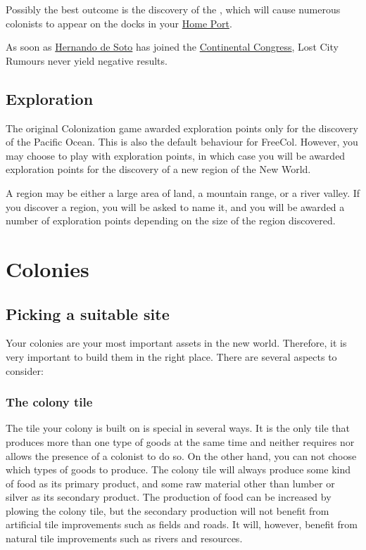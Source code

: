 \documentclass[12pt]{book}
\begin{document}
Possibly the best outcome is the discovery of the , which will cause numerous colonists to appear on the docks in
your \hyperlink{Home Port}{Home Port}.

As soon as \hyperlink{Hernando de Soto}{Hernando de Soto} has joined
the \hyperlink{Continental Congress}{Continental Congress}, Lost City
Rumours never yield negative results.


\hypertarget{Exploration}{\section{Exploration}}

The original Colonization game awarded exploration points only for the
discovery of the Pacific Ocean. This is also the default behaviour for
FreeCol. However, you may choose to play with exploration points, in
which case you will be awarded exploration points for the discovery of
a new region of the New World.

A region may be either a large area of land, a mountain range, or a
river valley. If you discover a region, you will be asked to name it,
and you will be awarded a number of exploration points depending on
the size of the region discovered.


\hypertarget{Colonies}{\chapter{Colonies}}

\hypertarget{Picking a suitable site}{\section{Picking a suitable site}}

Your colonies are your most important assets in the new world.
Therefore, it is very important to build them in the right
place. There are several aspects to consider:

\hypertarget{The colony tile}{\subsection{The colony tile}}

The tile your colony is built on is special in several ways. It is the
only tile that produces more than one type of goods at the same time
and neither requires nor allows the presence of a colonist to do
so. On the other hand, you can not choose which types of goods to
produce. The colony tile will always produce some kind of food as its
primary product, and some raw material other than lumber or silver as
its secondary product. The production of food can be increased by
plowing the colony tile, but the secondary production will not benefit
from artificial tile improvements such as fields and roads. It will,
however, benefit from natural tile improvements such as rivers and
resources.
\end{document}
